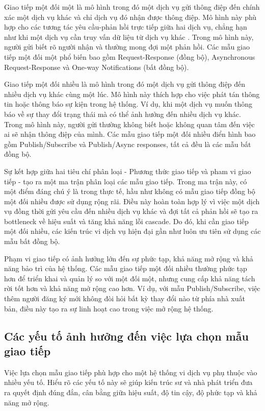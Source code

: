 Giao tiếp một đối một là mô hình trong đó một dịch vụ gửi thông điệp đến chính xác một dịch vụ khác và chỉ dịch vụ đó nhận được thông điệp. Mô hình này phù hợp cho các tương tác yêu cầu-phản hồi trực tiếp giữa hai dịch vụ, chẳng hạn như khi một dịch vụ cần truy vấn dữ liệu từ dịch vụ khác \cite{richardson2019}. Trong mô hình này, người gửi biết rõ người nhận và thường mong đợi một phản hồi. Các mẫu giao tiếp một đối một phổ biến bao gồm Request-Response (đồng bộ), Asynchronous Request-Response và One-way Notifications (bất đồng bộ).

Giao tiếp một đối nhiều là mô hình trong đó một dịch vụ gửi thông điệp đến nhiều dịch vụ khác cùng một lúc. Mô hình này thích hợp cho việc phát tán thông tin hoặc thông báo sự kiện trong hệ thống. Ví dụ, khi một dịch vụ muốn thông báo về sự thay đổi trạng thái mà có thể ảnh hưởng đến nhiều dịch vụ khác. Trong mô hình này, người gửi thường không biết hoặc không quan tâm đến việc ai sẽ nhận thông điệp của mình. Các mẫu giao tiếp một đối nhiều điển hình bao gồm Publish/Subscribe và Publish/Async responses, tất cả đều là các mẫu bất đồng bộ.

Sự kết hợp giữa hai tiêu chí phân loại - Phương thức giao tiếp và pham vi giao tiếp - tạo ra một ma trận phân loại các mẫu giao tiếp. Trong ma trận này, có một điểm đáng chú ý là trong thực tế, hầu như không có mẫu giao tiếp đồng bộ một đối nhiều được sử dụng rộng rãi. Điều này hoàn toàn hợp lý vì việc một dịch vụ đồng thời gửi yêu cầu đến nhiều dịch vụ khác và đợi tất cả phản hồi sẽ tạo ra bottleneck về hiệu suất và tăng khả năng lỗi cascade. Do đó, khi cần giao tiếp một đối nhiều, các kiến trúc vi dịch vụ hiện đại gần như luôn ưu tiên sử dụng các mẫu bất đồng bộ.

Phạm vi giao tiếp có ảnh hưởng lớn đến sự phức tạp, khả năng mở rộng và khả năng bảo trì của hệ thống. Các mẫu giao tiếp một đối nhiều thường phức tạp hơn để triển khai và quản lý so với một đối một, nhưng cung cấp khả năng tách rời tốt hơn và khả năng mở rộng cao hơn. Ví dụ, với mẫu Publish/Subscribe, việc thêm người đăng ký mới không đòi hỏi bất kỳ thay đổi nào từ phía nhà xuất bản, điều này tạo ra sự linh hoạt cao trong việc mở rộng hệ thống.

\subsection{Các yếu tố ảnh hưởng đến việc lựa chọn mẫu giao tiếp}
Việc lựa chọn mẫu giao tiếp phù hợp cho một hệ thống vi dịch vụ phụ thuộc vào nhiều yếu tố. Hiểu rõ các yếu tố này sẽ giúp kiến trúc sư và nhà phát triển đưa ra quyết định đúng đắn, cân bằng giữa hiệu suất, độ tin cậy, độ phức tạp và khả năng mở rộng.

